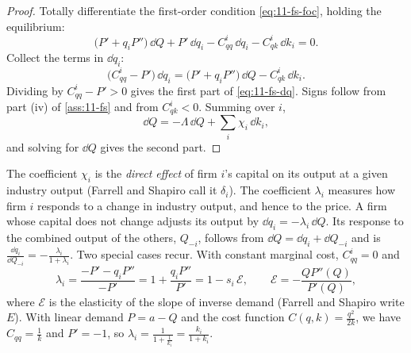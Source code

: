 \begin{proof}
Totally differentiate the first-order condition \eqref{eq:11-fs-foc}, holding the equilibrium:
\begin{equation*}
\big(P' + q_i P''\big)\,\dd Q + P'\,\dd q_i - C^i_{qq}\,\dd q_i - C^i_{qk}\,\dd k_i = 0 .
\end{equation*}
Collect the terms in $\dd q_i$:
\begin{equation*}
\big(C^i_{qq} - P'\big)\,\dd q_i = \big(P' + q_i P''\big)\,\dd Q - C^i_{qk}\,\dd k_i .
\end{equation*}
Dividing by $C^i_{qq} - P' > 0$ gives the first part of \eqref{eq:11-fs-dq}. Signs follow from part (iv) of
\cref{ass:11-fs} and from $C^i_{qk} < 0$. Summing over $i$,
\begin{equation*}
\dd Q = -\Lambda\,\dd Q + \sum_i \chi_i\,\dd k_i ,
\end{equation*}
and solving for $\dd Q$ gives the second part.
\end{proof}

The coefficient $\chi_i$ is the \emph{direct effect} of firm $i$'s capital on its output at a given industry
output (Farrell and Shapiro call it $\delta_i$). The coefficient $\lambda_i$ measures how firm $i$ responds to a
change in industry output, and hence to the price. A firm whose capital does not change adjusts its output by
$\dd q_i = -\lambda_i\,\dd Q$. Its response to the combined output of the others, $Q_{-i}$, follows from
$\dd Q = \dd q_i + \dd Q_{-i}$ and is $\frac{\dd q_i}{\dd Q_{-i}} = -\frac{\lambda_i}{1 + \lambda_i}$. Two special
cases recur. With constant marginal cost, $C^i_{qq} = 0$ and
\begin{equation}\label{eq:11-fs-lambda-const}
\lambda_i = \frac{-P' - q_i P''}{-P'} = 1 + \frac{q_i P''}{P'} = 1 - s_i\,\mathcal{E},
\qquad
\mathcal{E} = -\frac{Q P''(Q)}{P'(Q)},
\end{equation}
where $\mathcal{E}$ is the elasticity of the slope of inverse demand (Farrell and Shapiro write $E$). With linear
demand $P = a - Q$ and the cost function $C(q, k) = \frac{q^2}{2k}$, we have $C_{qq} = \frac{1}{k}$ and
$P' = -1$, so $\lambda_i = \frac{1}{1 + \frac{1}{k_i}} = \frac{k_i}{1 + k_i}$.

